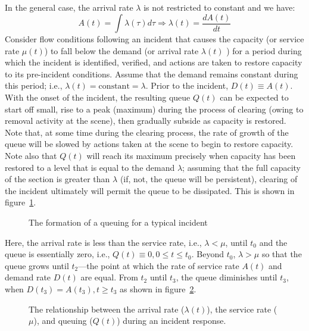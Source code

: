 \documentclass[12pt]{report}
\newcommand{\inputTikZ}[1]{%
    \begin{singlespace}
    \end{singlespace}
  }
\newcommand{\inputTikZ}[1]{%
    \begin{singlespace}
    \beginpgfgraphicnamed{#1-external}%
    \endpgfgraphicnamed%
    \end{singlespace}
  }
\newcounter{time}
\newcounter{space}
\begin{document}
In the general case, the arrival rate $\lambda$ is not restricted to constant and we have:
\begin{equation*}
  \label{eq:gen-arr}
  A(t) = \int\lambda(\tau)d\tau \Rightarrow \lambda(t) = \frac{dA(t)}{dt} 
\end{equation*}
Consider flow conditions following an incident that causes the
capacity (or service rate $\mu(t)$) to fall below the demand (or
arrival rate $\lambda(t)$ ) for a period during which the incident is
identified, verified, and actions are taken to restore capacity to its
pre-incident conditions.  Assume that the demand remains constant
during this period; i.e., $\lambda(t) = \mathrm{constant} = \lambda$.
Prior to the incident, $D(t) \equiv A(t)$.  With the onset of the
incident, the resulting queue $Q(t)$ can be expected to start off
small, rise to a peak (maximum) during the process of clearing (owing
to removal activity at the scene), then gradually subside as capacity
is restored. Note that, at some time during the clearing process, the
rate of growth of the queue will be slowed by actions taken at the
scene to begin to restore capacity. Note also that $Q(t)$ will reach
its maximum precisely when capacity has been restored to a level that
is equal to the demand $\lambda$; assuming that the full capacity of
the section is greater than $\lambda$ (if, not, the queue will be
persistent), clearing of the incident ultimately will permit the queue
to be dissipated. This is shown in
figure~\ref{fig:general-incident-queuing}.
\begin{figure}[tbp]
  \begin{center}
    \inputTikZ{figs/queuing-formation-for-typical-incident}
    \caption{The formation of a queuing for a typical incident}
    \label{fig:general-incident-queuing} 
  \end{center}
\end{figure}

Here, the arrival rate is less than the service rate, i.e., $\lambda <
\mu$, until $t_0$ and the queue is essentially zero, i.e., $Q(t)
\equiv 0, 0 \le t \le t_0$. Beyond $t_0$, $\lambda > \mu$ so that the
queue grows until $t_2$---the point at which the rate of service rate
$A(t)$ and demand rate $D(t)$ are equal.  From $t_2$ until $t_3$, the
queue diminishes until $t_3$, when $D(t_3) = A(t_3), t \ge t_3$ as
shown in figure~\ref{fig:arrival-service-and-queuing}.
\begin{figure}[tbp]
  \begin{center}
    \inputTikZ{figs/arrival-service-and-queuing}
    \caption[The relationship between the arrival rate, the service
    rate, and queuing during an incident response]{The relationship
      between the arrival rate ($\lambda(t)$), the service rate
      ($\mu$), and queuing ($Q(t)$) during an incident response.}
    \label{fig:arrival-service-and-queuing}
  \end{center}
\end{figure}
\end{document}
